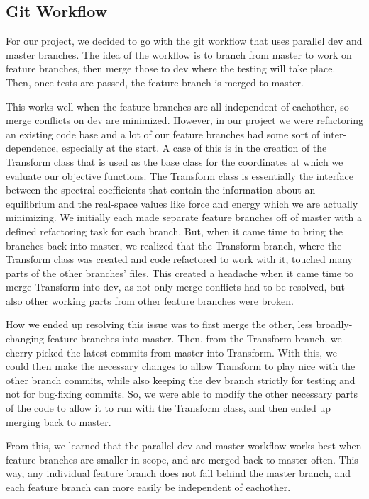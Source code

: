 \documentclass{article}
\begin{document}
\subsection{Git Workflow}

For our project, we decided to go with the git workflow that uses parallel dev and master branches.
The idea of the workflow is to branch from master to work on feature branches, then merge those to dev where the testing will take place.
Then, once tests are passed, the feature branch is merged to master.

This works well when the feature branches are all independent of eachother, so merge conflicts on dev are minimized.
However, in our project we were refactoring an existing code base and a lot of our feature branches had some sort of inter-dependence, especially at the start.
A case of this is in the creation of the Transform class that is used as the base class for the coordinates at which we evaluate our objective functions.
The Transform class is essentially the interface between the spectral coefficients that contain the information about an equilibrium and the real-space values like force and energy which we are actually minimizing.
We initially each made separate feature branches off of master with a defined refactoring task for each branch.
But, when it came time to bring the branches back into master, we realized that the Transform branch, where the Transform class was created and code refactored to work with it, touched many parts of the other branches' files.
This created a headache when it came time to merge Transform into dev, as not only merge conflicts had to be resolved, but also other working parts from other feature branches were broken.

How we ended up resolving this issue was to first merge the other, less broadly-changing feature branches into master.
Then, from the Transform branch, we cherry-picked the latest commits from master into Transform.
With this, we could then make the necessary changes to allow Transform to play nice with the other branch commits, while also keeping the dev branch strictly for testing and not for bug-fixing commits.
So, we were able to modify the other necessary parts of the code to allow it to run with the Transform class, and then ended up merging back to master.

From this, we learned that the parallel dev and master workflow works best when feature branches are smaller in scope, and are merged back to master often.
This way, any individual feature branch does not fall behind the master branch, and each feature branch can more easily be independent of eachother.
\end{document}
